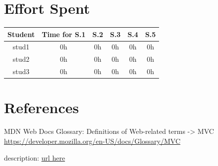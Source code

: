 \documentclass[table, 12pt]{article}
\begin{document}
\newpage
\section{Effort Spent}
    \begin{tabular}{|c||c|c|c|c|c|}
        \hline
        Student & Time for S.1 & S.2 & S.3 & S.4 & S.5\\ \hline
        stud1 & 0h & 0h & 0h & 0h & 0h \\
        stud2 & 0h & 0h & 0h & 0h & 0h \\
        stud3 & 0h & 0h & 0h & 0h & 0h \\
        \hline
    \end{tabular}


\section{References}


\begin{thebibliography}{9}
    MDN Web Docs Glossary: Definitions of Web-related terms -> MVC
    \url{https://developer.mozilla.org/en-US/docs/Glossary/MVC}

    description: \url{url here}
    
\end{thebibliography}
\end{document}
